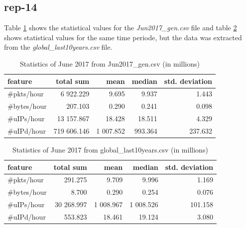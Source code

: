 \subsection*{rep-14}
Table \ref{tab:stat_jun2017_gen} shows the statistical values for the \textit{Jun2017\_gen.csv} file and table \ref{tab:stat_jun2017_global} shows statistical values for the same time periode, but the data was extracted from the \textit{global\_last10years.csv} file. 
\begin{table}[H]
\center
\begin{tabular}{lrrrr}
\toprule
feature & total sum & mean & median & std. deviation \\
\midrule
\#pkts/hour & 6 922.229  &   9.695  &    9.937  &   1.443 \\
\#bytes/hour & 207.103  &   0.290   &   0.241  &   0.098 \\
\#uIPs/hour  & 13 157.867  &  18.428  &   18.511 &    4.329 \\
\#uIPd/hour  & 719 606.146 &  1 007.852 &   993.364 &  237.632 \\
\bottomrule
\end{tabular}
\caption{Statistics of June 2017 from Jun2017\_gen.csv (in millions)}
\label{tab:stat_jun2017_gen}
\end{table}

\begin{table}[H]
\center
\begin{tabular}{lrrrr}
\toprule
feature & total sum & mean & median & std. deviation \\
\midrule
\#pkts/hour  &    291.275  &      9.709  &      9.996   &    1.169 \\
\#bytes/hour &      8.700  &      0.290  &      0.254   &    0.076 \\
\#uIPs/hour  & 30 268.997  &  1 008.967  &  1 008.526   &  101.158\\
\#uIPd/hour  &    553.823  &     18.461  &     19.124   &    3.080 \\
\bottomrule
\end{tabular}
\caption{Statistics of June 2017 from global\_last10years.csv (in millions)}
\label{tab:stat_jun2017_global}
\end{table}

